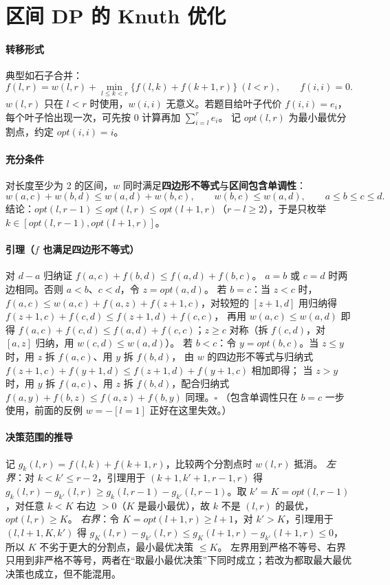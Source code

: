 \section{区间 DP 的 Knuth 优化}\label{knowledge-quadrangle-knuth}
\paragraph{转移形式} 典型如石子合并：
\[
 f(l,r)=w(l,r)+\min_{l\le k<r}\bigl\{f(l,k)+f(k+1,r)\bigr\}\ (l<r),\qquad f(i,i)=0.
\]
$w(l,r)$ 只在 $l<r$ 时使用，$w(i,i)$ 无意义。若题目给叶子代价 $f(i,i)=e_i$，每个叶子恰出现一次，可先按 0 计算再加 $\sum_{i=l}^re_i$。
记 $opt(l,r)$ 为最小最优分割点，约定 $opt(i,i)=i$。

\paragraph{充分条件} 对长度至少为 2 的区间，$w$ 同时满足\textbf{四边形不等式}与\textbf{区间包含单调性}：
\[
 w(a,c)+w(b,d)\le w(a,d)+w(b,c),\qquad w(b,c)\le w(a,d),\qquad a\le b\le c\le d.
\]
结论：$opt(l,r-1)\le opt(l,r)\le opt(l+1,r)$（$r-l\ge2$），于是只枚举 $k\in[opt(l,r-1),opt(l+1,r)]$。

\paragraph{引理（$f$ 也满足四边形不等式）} 对 $d-a$ 归纳证 $f(a,c)+f(b,d)\le f(a,d)+f(b,c)$。
$a=b$ 或 $c=d$ 时两边相同。否则 $a<b$、$c<d$，令 $z=opt(a,d)$。
若 $b=c$：当 $z<c$ 时，$f(a,c)\le w(a,c)+f(a,z)+f(z+1,c)$，对较短的 $[z+1,d]$ 用归纳得 $f(z+1,c)+f(c,d)\le f(z+1,d)+f(c,c)$，
再用 $w(a,c)\le w(a,d)$ 即得 $f(a,c)+f(c,d)\le f(a,d)+f(c,c)$；$z\ge c$ 对称（拆 $f(c,d)$，对 $[a,z]$ 归纳，用 $w(c,d)\le w(a,d)$）。
若 $b<c$：令 $y=opt(b,c)$。当 $z\le y$ 时，用 $z$ 拆 $f(a,c)$、用 $y$ 拆 $f(b,d)$，
由 $w$ 的四边形不等式与归纳式 $f(z+1,c)+f(y+1,d)\le f(z+1,d)+f(y+1,c)$ 相加即得；
当 $z>y$ 时，用 $y$ 拆 $f(a,c)$、用 $z$ 拆 $f(b,d)$，配合归纳式 $f(a,y)+f(b,z)\le f(a,z)+f(b,y)$ 同理。$\square$
（包含单调性只在 $b=c$ 一步使用，前面的反例 $w=-[l=1]$ 正好在这里失效。）

\paragraph{决策范围的推导} 记 $g_k(l,r)=f(l,k)+f(k+1,r)$，比较两个分割点时 $w(l,r)$ 抵消。
\textit{左界}：对 $k<k'\le r-2$，引理用于 $(k+1,k'+1,r-1,r)$ 得
$g_k(l,r)-g_{k'}(l,r)\ge g_k(l,r-1)-g_{k'}(l,r-1)$。取 $k'=K=opt(l,r-1)$，对任意 $k<K$ 右边 $>0$（$K$ 是最小最优），故 $k$ 不是 $(l,r)$ 的最优，$opt(l,r)\ge K$。
\textit{右界}：令 $K=opt(l+1,r)\ge l+1$，对 $k'>K$，引理用于 $(l,l+1,K,k')$ 得
$g_K(l,r)-g_{k'}(l,r)\le g_K(l+1,r)-g_{k'}(l+1,r)\le0$，所以 $K$ 不劣于更大的分割点，最小最优决策 $\le K$。
左界用到严格不等号、右界只用到非严格不等号，两者在“取最小最优决策”下同时成立；若改为都取最大最优决策也成立，但不能混用。


